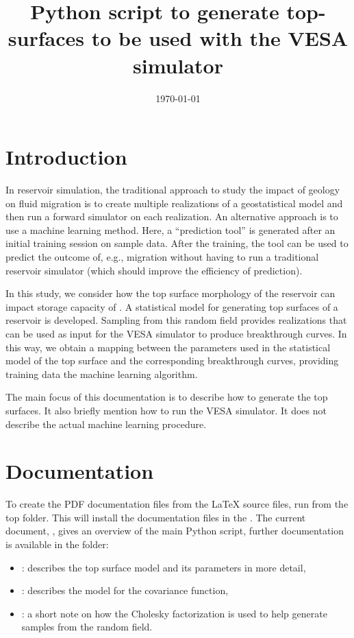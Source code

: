 \documentclass[11pt,a4paper]{amsart}
\begin{document}
\title{Python script to generate top-surfaces to be used with the VESA simulator}
\date{\today}
\maketitle
\section{Introduction}
\label{sec:introduction}
In reservoir simulation, the traditional approach to study the impact of
geology on fluid migration is 
to create multiple realizations of a geostatistical model and then run a
forward simulator on each realization. An alternative approach is to use a
machine learning method. Here, a ``prediction tool'' is generated after an initial
training session on sample data. After the training, the tool can be
used to predict the outcome of, e.g., \cotwo{} migration without having to run
a traditional reservoir simulator (which should improve the efficiency of prediction).

In this study, we consider how the top surface morphology of the
reservoir can impact storage capacity \cite{nil12:imp} of \cotwo{}.
A statistical model for generating top surfaces of a
reservoir is developed. Sampling from this random field provides 
realizations that can be used as input for the VESA simulator
\cite{gas09:ver} to produce breakthrough curves. In this way, we obtain a
mapping between the parameters used in the statistical model of the top
surface and the corresponding
breakthrough curves, providing training data the machine learning algorithm.

The main focus of this documentation is to describe how to generate the top
surfaces. It also briefly mention how to run the VESA simulator.
It does not describe the actual machine learning procedure. 

\section{Documentation}
To create the PDF documentation files from the \LaTeX{} source files,
run  from the top folder. This will install the documentation files in the \docsFolder{}.
The current document, \docMain{}, gives an overview of the main Python script,
further documentation is available in the \docsFolder{} folder:  
\begin{itemize}
\item \docSetup {} : describes the top surface model and its parameters in
  more detail, 
\item \docVariogram{} : describes the model for the covariance function,
\item \docCholesky{} : a short note on how the Cholesky factorization is used
  to help generate samples from the random field.
\end{itemize}
\end{document}
